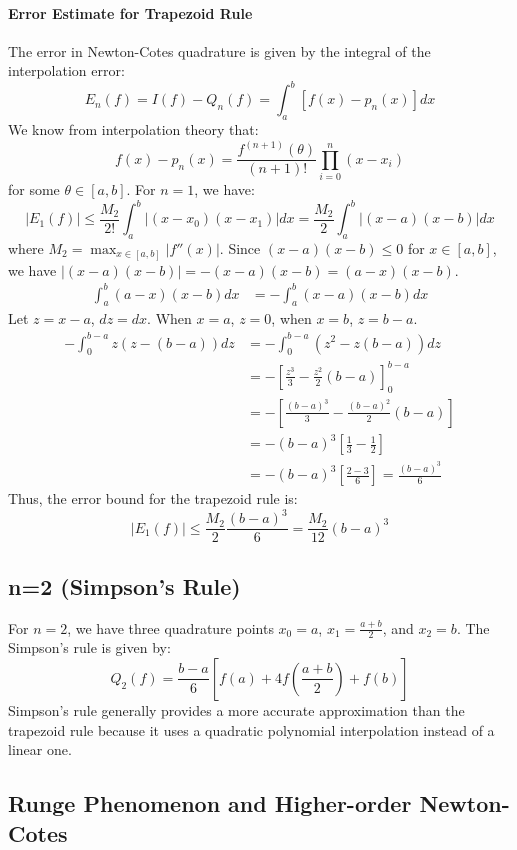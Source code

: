\documentclass{article}
\begin{document}
\paragraph{Error Estimate for Trapezoid Rule}
The error in Newton-Cotes quadrature is given by the integral of the interpolation error:
\[
E_n(f) = I(f) - Q_n(f) = \int_a^b [f(x) - p_n(x)] dx
\]
We know from interpolation theory that:
\[
f(x) - p_n(x) = \frac{f^{(n+1)}(\theta)}{(n+1)!} \prod_{i=0}^{n} (x - x_i)
\]
for some $\theta \in [a, b]$.
For $n=1$, we have:
\[
|E_1(f)| \leq \frac{M_2}{2!} \int_a^b |(x - x_0)(x - x_1)| dx = \frac{M_2}{2} \int_a^b |(x - a)(x - b)| dx
\]
where $M_2 = \max_{x \in [a, b]} |f''(x)|$.
Since $(x-a)(x-b) \leq 0$ for $x \in [a, b]$, we have $|(x-a)(x-b)| = -(x-a)(x-b) = (a-x)(x-b)$.
\begin{align*}
\int_a^b (a-x)(x-b) dx &= -\int_a^b (x-a)(x-b) dx
\end{align*}
Let $z = x - a$, $dz = dx$. When $x=a$, $z=0$, when $x=b$, $z=b-a$.
\begin{align*}
-\int_0^{b-a} z(z - (b-a)) dz &= -\int_0^{b-a} (z^2 - z(b-a)) dz \\
&= -\left[ \frac{z^3}{3} - \frac{z^2}{2} (b-a) \right]_0^{b-a} \\
&= -\left[ \frac{(b-a)^3}{3} - \frac{(b-a)^2}{2} (b-a) \right] \\
&= -(b-a)^3 \left[ \frac{1}{3} - \frac{1}{2} \right] \\
&= -(b-a)^3 \left[ \frac{2 - 3}{6} \right] = \frac{(b-a)^3}{6}
\end{align*}
Thus, the error bound for the trapezoid rule is:
\[
|E_1(f)| \leq \frac{M_2}{2} \frac{(b-a)^3}{6} = \frac{M_2}{12} (b-a)^3
\]

\subsection{n=2 (Simpson's Rule)}

For $n=2$, we have three quadrature points $x_0 = a$, $x_1 = \frac{a+b}{2}$, and $x_2 = b$. The Simpson's rule is given by:
\[
Q_2(f) = \frac{b - a}{6} [f(a) + 4f(\frac{a+b}{2}) + f(b)]
\]
Simpson's rule generally provides a more accurate approximation than the trapezoid rule because it uses a quadratic polynomial interpolation instead of a linear one.

\subsection{Runge Phenomenon and Higher-order Newton-Cotes}
\end{document}
